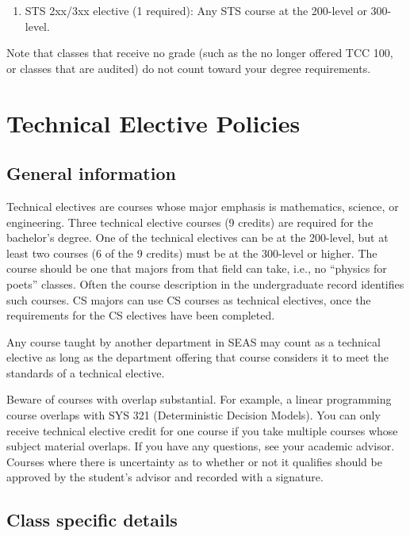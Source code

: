 \documentclass[12pt,twoside]{article}
\begin{document}
\begin{enumerate}
\item STS 2xx/3xx elective (1 required): Any STS course at the
200-level or 300-level.

\end{enumerate}

Note that classes that receive no grade (such as the no longer offered
TCC 100, or classes that are audited) do not count toward your degree
requirements.

\section{Technical Elective Policies}

\label{techelectives}

\subsection{General information}

Technical electives are courses whose major emphasis is mathematics,
science, or engineering.  Three technical elective courses (9 credits)
are required for the bachelor's degree. One of the technical electives
can be at the 200-level, but at least two courses (6 of the 9 credits)
must be at the 300-level or higher.  The course should be one that
majors from that field can take, i.e., no ``physics for poets''
classes. Often the course description in the undergraduate record
identifies such courses. CS majors can use CS courses as technical
electives, once the requirements for the CS electives have been
completed.

Any course taught by another department in SEAS may count as a
technical elective as long as the department offering that course
considers it to meet the standards of a technical elective.

Beware of courses with overlap substantial.  For example, a linear
programming course overlaps with SYS 321 (Deterministic Decision
Models).  You can only receive technical elective credit for one
course if you take multiple courses whose subject material overlaps.
If you have any questions, see your academic advisor.  Courses where
there is uncertainty as to whether or not it qualifies should be
approved by the student's advisor and recorded with a signature.

\subsection{Class specific details}
\end{document}

